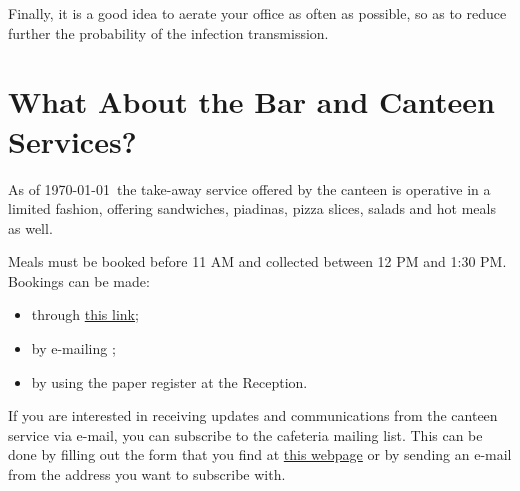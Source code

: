 \documentclass{sissavademecum}
\begin{document}
Finally, it is a good idea to aerate your office as often as possible, so as to reduce further the probability of the infection transmission.


\section{What About the Bar and Canteen Services?}

As of \today\ the take-away service offered by the canteen is operative in a limited fashion, offering sandwiches, piadinas, pizza slices, salads and hot meals as well.

Meals must be booked before 11 AM and collected between 12 PM and 1:30 PM. Bookings can be made:
\begin{itemize}
	\item through \href{https://www.sissa.it/cafeteria}{this link};
	\item by e-mailing ;
	\item by using the paper register at the Reception.
\end{itemize}

If you are interested in receiving updates and communications from the canteen service via e-mail, you can subscribe to the cafeteria mailing list. This can be done by filling out the form that you find at \href{https://go.sissa.it/cafeteria}{this webpage} or by sending an e-mail from the address you want to subscribe with.

\begin{comment}
As of \today\ the bar is fully operational and open from 9:00 to 11:00 and from 14:00 to 15:00, while the canteen is open from 12:00 to 14:00.

You can eat plated canteen food in the canteen by booking a specific time and place beforehand at \url{https://services.sissa.it/mensa/}. You can also get take-away meals (but \textbf{not} eat them in the canteen, even if you've booked a table) even without booking them in advance.

If instead you prefer to get takeaway sandwiches/piadinas/salads, if have to book them in advance (by 11:00) in one of the following ways:
\begin{itemize}
\item on \url{https://www.sissa.it/cafeteria}
\item by sending an email to \linkemail{ristobar@sissa.it}
\item via the paper register at the reception
\end{itemize}
Sandwiches/piadinas/salads can then be collected at the canteen from 12:00 to 14:00.
\end{comment}
\end{document}
